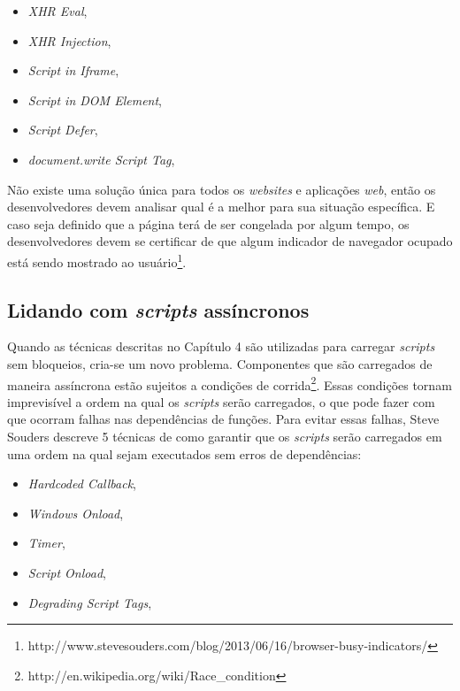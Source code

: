 \begin{itemize}
	\item \textit{XHR Eval}, \cite[p.~29]{EvenFaster}
	\item \textit{XHR Injection}, \cite[p.~31]{EvenFaster}
	\item \textit{Script in Iframe}, \cite[p.~31]{EvenFaster}
	\item \textit{Script in DOM Element}, \cite[p.~32]{EvenFaster}
	\item \textit{Script Defer}, \cite[p.~32]{EvenFaster}
	\item \textit{document.write Script Tag}, \cite[p.~33]{EvenFaster}
\end{itemize}

Não existe uma solução única para todos os \textit{websites} e aplicações \textit{web}, então os desenvolvedores devem analisar qual é a melhor para sua situação específica. E caso seja definido que a página terá de ser congelada por algum tempo, os desenvolvedores devem se certificar de que algum indicador de navegador ocupado está sendo mostrado ao usuário\footnote{http://www.stevesouders.com/blog/2013/06/16/browser-busy-indicators/}.

\subsection{Lidando com \textit{scripts} assíncronos}
\label{subsec:evenfaster_cap5}
Quando as técnicas descritas no Capítulo 4 \cite[p.~27]{EvenFaster} são utilizadas para carregar \textit{scripts} sem bloqueios, cria-se um novo problema. Componentes que são carregados de maneira assíncrona estão sujeitos a condições de corrida\footnote{http://en.wikipedia.org/wiki/Race\_condition}. Essas condições tornam imprevisível a ordem na qual os \textit{scripts} serão carregados, o que pode fazer com que ocorram falhas nas dependências de funções. Para evitar essas falhas, Steve Souders descreve 5 técnicas de como garantir que os \textit{scripts} serão carregados em uma ordem na qual sejam executados sem erros de dependências:

\begin{itemize}
	\item \textit{Hardcoded Callback}, \cite[p.~46]{EvenFaster}
	\item \textit{Windows Onload}, \cite[p.~47]{EvenFaster}
	\item \textit{Timer}, \cite[p.~48]{EvenFaster}
	\item \textit{Script Onload}, \cite[p.~49]{EvenFaster}
	\item \textit{Degrading Script Tags}, \cite[p.~50]{EvenFaster}
\end{itemize}

